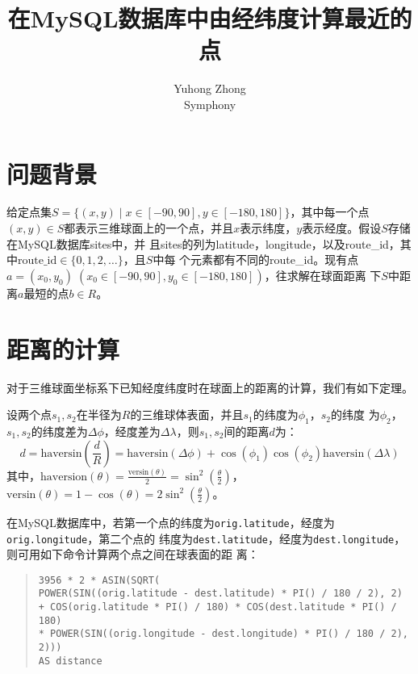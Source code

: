 
\title{\textbf{在MySQL数据库中由经纬度计算最近的点}}
\author{Yuhong Zhong\\[-0.5em]\scriptsize Symphony}
\date{}

\maketitle
\section{问题背景}
给定点集$S=\{(x,y)\mid x\in[-90, 90], y\in[-180,
180]\}$，其中每一个点$(x, y)\in
S$都表示三维球面上的一个点，并且$x$表示纬度，$y$表示经度。假设$S$存储在MySQL数据库sites中，并
且sites的列为latitude，longitude，以及route\_id，其中$\text{route\_id}\in\{0,1,2,\dots\}$，且$S$中每
个元素都有不同的route\_id。现有点$a=(x_0,y_0)\;(x_0\in[-90,90],y_0\in[-180,180])$，往求解在球面距离
下$S$中距离$a$最短的点$b\in R$。

\section{距离的计算}
对于三维球面坐标系下已知经度纬度时在球面上的距离的计算，我们有如下定理。

\begin{thm}[三维球体表面的距离]
  设两个点$s_1,s_2$在半径为$R$的三维球体表面，并且$s_1$的纬度为$\phi_1$，$s_2$的纬度
  为$\phi_2$，$s_1,s_2$的纬度差为$\Delta\phi$，经度差为$\Delta\lambda$，则$s_1,s_2$间的距离$d$为：
\begin{displaymath}
  d=\mathrm{haversin}(\frac{d}{R})=\mathrm{haversin}(\Delta\phi)+\cos(\phi_1)\cos(\phi_2)\mathrm{haversin}(\Delta\lambda)
\end{displaymath}
其中，$\mathrm{haversion}(\theta)=\frac{\mathrm{versin}(\theta)}{2}=\sin^2(\frac{\theta}{2})$，
$\mathrm{versin}(\theta)=1-\cos(\theta)=2\sin^2(\frac{\theta}{2})$。
\end{thm}

在MySQL数据库中，若第一个点的纬度为\texttt{orig.latitude}，经度为\texttt{orig.longitude}，第二个点的
纬度为\texttt{dest.latitude}，经度为\texttt{dest.longitude}，则可用如下命令计算两个点之间在球表面的距
离：

\begin{quote}
  \texttt{3956 * 2 * ASIN(SQRT(\\
    POWER(SIN((orig.latitude - dest.latitude) * PI() / 180 / 2), 2)\\
    + COS(orig.latitude * PI() / 180) * COS(dest.latitude * PI() / 180)\\
    * POWER(SIN((orig.longitude - dest.longitude) * PI() / 180 / 2), 2)))\\
    AS distance}
\end{quote}

